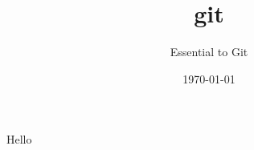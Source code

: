 \documentclass{beamer}
\title{git}
\subtitle{Essential to Git}
\date{\today}
\begin{document}
\begin{frame}
    \Large{Hello}
\end{frame}
\end{document}
